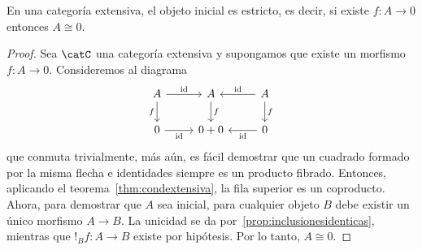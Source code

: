 \begin{lemma}
  En una categoría extensiva, el objeto inicial es estricto, es decir, si existe $f\colon A\to 0$ entonces $A\cong 0$.
\end{lemma}
\begin{proof}
  Sea $\catC$ una categoría extensiva y supongamos que existe un morfismo $f\colon A\to 0$.
  Consideremos al diagrama
  \begin{equation*}
    \begin{tikzcd}
      A\ar{r}{\id}\ar[swap]{d}{f} & A\ar{d}{f} & A\ar[swap]{l}{\id}\ar{d}{f} \\
      0\ar[swap]{r}{\id} & 0+0 & 0\ar{l}{\id}
    \end{tikzcd}
  \end{equation*}
  que conmuta trivialmente, más aún, es fácil demostrar que un cuadrado formado por la misma flecha e identidades siempre es un
  producto fibrado. Entonces, aplicando el teorema~\ref{thm:condextensiva}, la fila superior es un coproducto.
  Ahora, para demostrar que $A$ sea inicial, para cualquier objeto $B$ debe existir un único morfismo $A\to B$. 
  La unicidad se da por~\ref{prop:inclusionesidenticas}, mientras que $!_Bf\colon A\to B$ existe por hipótesis. 
  Por lo tanto, $A\cong 0$.
\end{proof}

